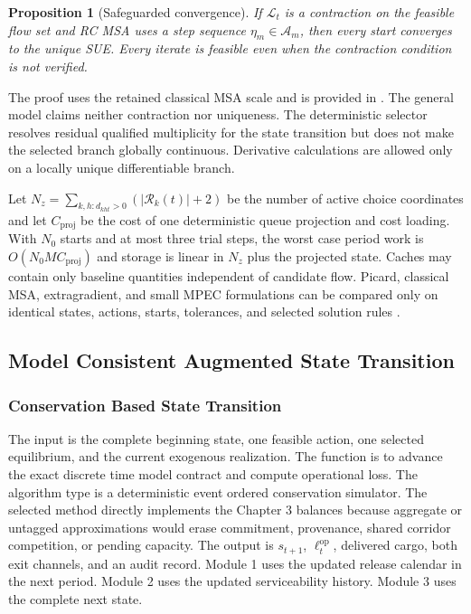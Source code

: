 \documentclass[a4paper,fleqn]{cas-sc}
\newtheorem{proposition}{Proposition}
\begin{document}
\begin{proposition}[Safeguarded convergence]
\label{prop:rcmsa-convergence}
If $\mathcal L_t$ is a contraction on the feasible flow set and RC MSA uses a
step sequence $\eta_m\in\mathcal A_m$, then every start converges to the unique
SUE. Every iterate is feasible even when the contraction condition is not
verified.
\end{proposition}
The proof uses the retained classical MSA scale and is provided in
. The general model claims neither contraction nor uniqueness.
The deterministic selector resolves residual qualified multiplicity for the
state transition but does not make the selected branch globally continuous.
Derivative calculations are allowed only on a locally unique differentiable
branch.

Let
$N_z=\sum_{k,h:d_{kht}>0}(|\mathcal R_k(t)|+2)$ be the number of active choice
coordinates and let $C_{\mathrm{proj}}$ be the cost of one deterministic queue
projection and cost loading. With $N_0$ starts and at most three trial steps,
the worst case period work is $O(N_0 M C_{\mathrm{proj}})$ and storage is
linear in $N_z$ plus the projected state. Caches may contain only baseline
quantities independent of candidate flow. Picard, classical MSA,
extragradient, and small MPEC formulations can be compared only on identical
states, actions, starts, tolerances, and selected solution rules
\citep{Patriksson2008,YangZhangMeng2007}.

\subsection{Model Consistent Augmented State Transition}
\label{subsec:transition-algorithm}

\subsubsection{Conservation Based State Transition}
The input is the complete beginning state, one feasible action, one selected
equilibrium, and the current exogenous realization. The function is to advance
the exact discrete time model contract and compute operational loss. The
algorithm type is a deterministic event ordered conservation simulator. The
selected method directly implements the Chapter 3 balances because aggregate
or untagged approximations would erase commitment, provenance, shared corridor
competition, or pending capacity. The output is $s_{t+1}$,
$\ell_t^{\mathrm{op}}$, delivered cargo, both exit channels, and an audit
record. Module 1 uses the updated release calendar in the next period. Module 2
uses the updated serviceability history. Module 3 uses the complete next state.
\end{document}
